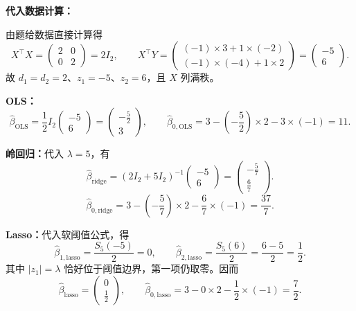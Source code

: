 \documentclass[12pt,a4paper]{article}
\begin{document}
\begin{answerbox}
\textbf{代入数据计算：}

由题给数据直接计算得
\begin{equation*}
X^{\top}X=
\begin{pmatrix}2&0\\0&2\end{pmatrix}=2I_2,
\qquad
X^{\top}Y=
\begin{pmatrix}
(-1)\times3+1\times(-2)\\
(-1)\times(-4)+1\times2
\end{pmatrix}
=\begin{pmatrix}-5\\6\end{pmatrix}.
\end{equation*}
故 $d_1=d_2=2$、$z_1=-5$、$z_2=6$，且 $X$ 列满秩。

\textbf{OLS：}
\begin{equation*}
\hat\beta_{\mathrm{OLS}}
=\frac12I_2\begin{pmatrix}-5\\6\end{pmatrix}
=\begin{pmatrix}-\frac52\\3\end{pmatrix},
\qquad
\hat\beta_{0,\mathrm{OLS}}
=3-\left(-\frac52\right)\times2-3\times(-1)
=11.
\end{equation*}

\textbf{岭回归：}代入 $\lambda=5$，有
\begin{equation*}
\hat\beta_{\mathrm{ridge}}
=(2I_2+5I_2)^{-1}\begin{pmatrix}-5\\6\end{pmatrix}
=\begin{pmatrix}-\frac57\\\frac67\end{pmatrix}.
\end{equation*}
\begin{equation*}
\hat\beta_{0,\mathrm{ridge}}
=3-\left(-\frac57\right)\times2-\frac67\times(-1)
=\frac{37}{7}.
\end{equation*}

\textbf{Lasso：}代入软阈值公式，得
\begin{equation*}
\hat\beta_{1,\mathrm{lasso}}=\frac{S_5(-5)}{2}=0,
\qquad
\hat\beta_{2,\mathrm{lasso}}=\frac{S_5(6)}{2}=\frac{6-5}{2}=\frac12.
\end{equation*}
其中 $|z_1|=\lambda$ 恰好位于阈值边界，第一项仍取零。因而
\begin{equation*}
\hat\beta_{\mathrm{lasso}}=\begin{pmatrix}0\\\frac12\end{pmatrix},
\qquad
\hat\beta_{0,\mathrm{lasso}}
=3-0\times2-\frac12\times(-1)
=\frac72.
\end{equation*}
\end{answerbox}
\end{document}

